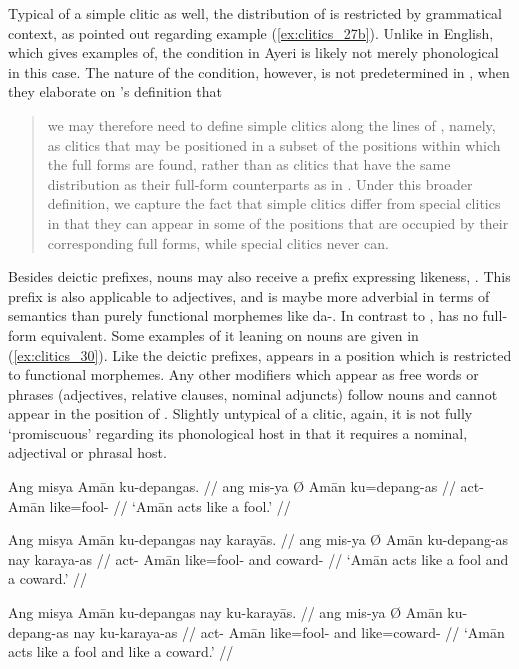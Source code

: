 Typical of a simple clitic as well, the distribution of  is
restricted by grammatical context, as pointed out regarding example
(\ref{ex:clitics_27b}). Unlike in English, which \citet{zwicky1977} gives
examples of, the condition in Ayeri is likely not merely phonological in this
case. The nature of the condition, however, is not predetermined in
\citet{spencerluis2012}, when they elaborate on \citet{zwicky1977}'s definition
that

\blockcquote[44]{spencerluis2012}{we may therefore need to define simple
clitics along the lines of \citet{halpern1998}, namely, as clitics that may be
positioned in a subset of the positions within which the full forms are found,
rather than as clitics that have the same distribution as their full-form
counterparts as in \citet{zwicky1977}. Under this broader definition, we
capture the fact that simple clitics differ from special clitics in that they
can appear in some of the positions that are occupied by their corresponding
full forms, while special clitics never can.}

Besides deictic prefixes, nouns may also receive a prefix expressing likeness,
. This prefix is also applicable to adjectives, and is maybe
more adverbial in terms of semantics than purely functional morphemes like
 {da-}. In contrast to ,  has no 
full-form equivalent. Some examples of it leaning on nouns are given in
(\ref{ex:clitics_30}). Like the deictic prefixes,  appears in a
position which is restricted to functional morphemes. Any other modifiers
which appear as free words or phrases (adjectives, relative clauses, nominal
adjuncts) follow nouns and cannot appear in the position of .
Slightly untypical of a clitic, again, it is not fully `promiscuous' regarding
its  phonological host in that it requires a nominal, adjectival or phrasal
host.

\pex\label{ex:clitics_30}
\a\label{ex:clitics_30a}\begingl
	\gla Ang misya {} Amān ku-depangas. //
	\glb ang mis-ya Ø Amān ku=depang-as //
	\glc \AgtT{} act-\TsgM{} \Top{} Amān like=fool-\Parg{} //
	\glft `Amān acts like a fool.' //
\endgl

\a\label{ex:clitics_30b}\begingl
	\gla Ang misya {} Amān ku-depangas nay karayās. //
	\glb ang mis-ya Ø Amān ku-depang-as nay karaya-as //
	\glc \AgtT{} act-\TsgM{} \Top{} Amān like=fool-\Parg{} and 
		coward-\Parg{} //
	\glft `Amān acts like a fool and a coward.' //
\endgl

\a\label{ex:clitics_30c}\begingl
	\gla Ang misya {} Amān ku-depangas nay ku-karayās. //
	\glb ang mis-ya Ø Amān ku-depang-as nay ku-karaya-as //
	\glc \AgtT{} act-\TsgM{} \Top{} Amān like=fool-\Parg{} and 
		like=coward-\Parg{}	//
	\glft `Amān acts like a fool and like a coward.' //
\endgl

